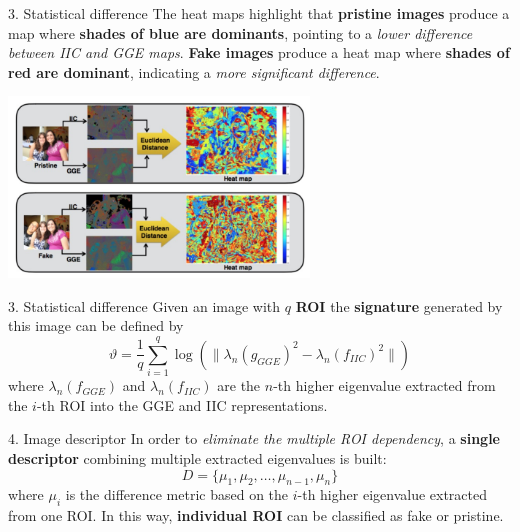 \begin{tframe}{3. Statistical difference}
The heat maps highlight that \textbf{pristine images} produce a map where \textbf{shades of blue are dominants}, pointing to a \emph{lower difference between IIC and GGE maps}. \textbf{Fake images} produce a heat map where \textbf{shades of red are dominant}, indicating a \textit{more significant difference}.
\vspace{0.2cm}
\begin{center}
\includegraphics[width=0.6\textwidth]{images/victor.jpg}
\end{center}
\end{tframe}

\begin{tframe}{3. Statistical difference}
Given an image with $q$ \textbf{ROI} the \textbf{signature} generated by this image can be defined by
\begin{equation}
\vartheta = \frac{1}{q} \sum_{i = 1}^{q} \log (\| \lambda_n (g_{GGE})^2 - \lambda_n (f_{IIC})^2 \|)
\end{equation}
\vspace{0.2cm}
where $\lambda_n(f_{GGE})$ and $\lambda_n(f_{IIC})$ are the $n$-th higher eigenvalue extracted from the $i$-th ROI into the GGE and IIC representations.
\end{tframe}

\begin{tframe}{4. Image descriptor}
In order to \emph{eliminate the multiple ROI dependency}, a \textbf{single descriptor} combining multiple extracted eigenvalues is built:
\vspace{0.2cm}
\begin{equation}
D = \{ \mu_1, \mu_2, \ldots, \mu_{n-1},\mu_n \}
\end{equation} 
\vspace{0.2cm}
where $\mu_i$ is the difference metric based on the $i$-th higher eigenvalue extracted from one ROI.
\vspace{0.2cm}
In this way, \textbf{individual ROI }can be classified as fake or pristine.
\end{tframe}

